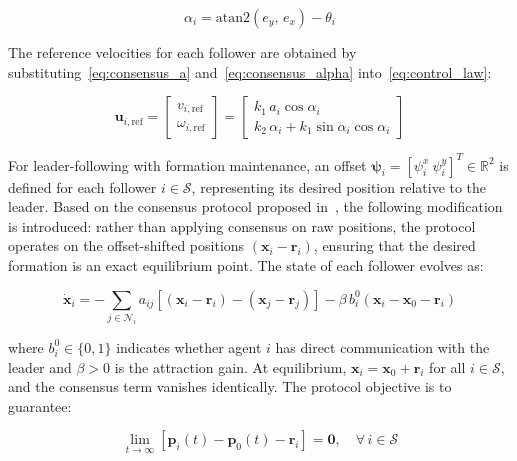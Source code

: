 \begin{equation}
    \alpha_i = \text{atan2}(e_y,\, e_x) - \theta_i
    \label{eq:consensus_alpha}
\end{equation}

The reference velocities for each follower are obtained by substituting~\eqref{eq:consensus_a} and~\eqref{eq:consensus_alpha} into~\eqref{eq:control_law}:

\begin{equation}
    \mathbf{u}_{i,\text{ref}} =
    \begin{bmatrix} v_{i,\text{ref}} \\ \omega_{i,\text{ref}} \end{bmatrix}
    =
    \begin{bmatrix} k_1\, a_i \cos\alpha_i \\ k_2\, \alpha_i + k_1 \sin\alpha_i \cos\alpha_i \end{bmatrix}
    \label{eq:ref_velocity}
\end{equation}

For leader-following with formation maintenance, an offset $\boldsymbol{\psi}_i = [\psi_i^x\ \psi_i^y]^T \in \mathbb{R}^2$ is defined for each follower $i \in \mathcal{S}$, representing its desired position relative to the leader. Based on the consensus protocol proposed in~\cite{koulong2024distributed}, the following modification is introduced: rather than applying consensus on raw positions, the protocol operates on the offset-shifted positions $(\mathbf{x}_i - \mathbf{r}_i)$, ensuring that the desired formation is an exact equilibrium point. The state of each follower evolves as:

\begin{equation}
    \dot{\mathbf{x}}_i = -\sum_{j \in \mathcal{N}_i} a_{ij}\left[(\mathbf{x}_i - \mathbf{r}_i) - (\mathbf{x}_j - \mathbf{r}_j)\right] - \beta\, b_i^0\left(\mathbf{x}_i - \mathbf{x}_0 - \mathbf{r}_i\right)
    \label{eq:formation_error}
\end{equation}

\noindent where $b_i^0 \in \{0,1\}$ indicates whether agent $i$ has direct communication with the leader and $\beta > 0$ is the attraction gain. At equilibrium, $\mathbf{x}_i = \mathbf{x}_0 + \mathbf{r}_i$ for all $i \in \mathcal{S}$, and the consensus term vanishes identically. The protocol objective is to guarantee:

\begin{equation}
    \lim_{t \to \infty} \left[ \mathbf{p}_i(t) - \mathbf{p}_0(t) - \mathbf{r}_i \right] = \mathbf{0}, \quad \forall\, i \in \mathcal{S}
    \label{eq:formation_objective}
\end{equation}


